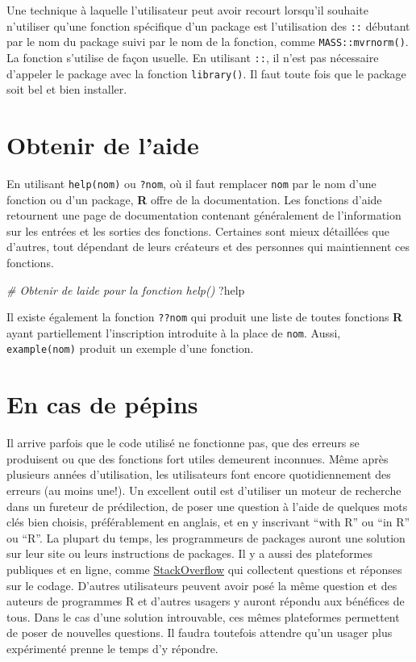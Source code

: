\documentclass[
]{book}
\newenvironment{Shaded}{}{}
\newcommand{\CommentTok}[1]{\textit{#1}}
\newcommand{\NormalTok}[1]{#1}
\begin{document}
Une technique à laquelle l'utilisateur peut avoir recourt lorsqu'il souhaite n'utiliser qu'une fonction spécifique d'un package est l'utilisation des \texttt{::} débutant par le nom du package suivi par le nom de la fonction, comme \texttt{MASS::mvrnorm()}. La fonction s'utilise de façon usuelle. En utilisant \texttt{::}, il n'est pas nécessaire d'appeler le package avec la fonction \texttt{library()}. Il faut toute fois que le package soit bel et bien installer.

\hypertarget{obtenir-de-laide}{%
\section{Obtenir de l'aide}\label{obtenir-de-laide}}

En utilisant \texttt{help(nom)} ou \texttt{?nom}, où il faut remplacer \texttt{nom} par le nom d'une fonction ou d'un package, \textbf{R} offre de la documentation. Les fonctions d'aide retournent une page de documentation contenant généralement de l'information sur les entrées et les sorties des fonctions. Certaines sont mieux détaillées que d'autres, tout dépendant de leurs créateurs et des personnes qui maintiennent ces fonctions.

\begin{Shaded}
\begin{Highlighting}[]
\CommentTok{\# Obtenir de l\textquotesingle{}aide pour la fonction help()}
\NormalTok{?help}
\end{Highlighting}
\end{Shaded}

Il existe également la fonction \texttt{??nom} qui produit une liste de toutes fonctions \textbf{R} ayant partiellement l'inscription introduite à la place de \texttt{nom}. Aussi, \texttt{example(nom)} produit un exemple d'une fonction.

\hypertarget{en-cas-de-puxe9pins}{%
\section{En cas de pépins}\label{en-cas-de-puxe9pins}}

Il arrive parfois que le code utilisé ne fonctionne pas, que des erreurs se produisent ou que des fonctions fort utiles demeurent inconnues. Même après plusieurs années d'utilisation, les utilisateurs font encore quotidiennement des erreurs (au moins une!). Un excellent outil est d'utiliser un moteur de recherche dans un fureteur de prédilection, de poser une question à l'aide de quelques mots clés bien choisis, préférablement en anglais, et en y inscrivant ``with R'' ou ``in R'' ou ``R''. La plupart du temps, les programmeurs de packages auront une solution sur leur site ou leurs instructions de packages. Il y a aussi des plateformes publiques et en ligne, comme \href{https://stackoverflow.com/}{StackOverflow} qui collectent questions et réponses sur le codage. D'autres utilisateurs peuvent avoir posé la même question et des auteurs de programmes R et d'autres usagers y auront répondu aux bénéfices de tous. Dans le cas d'une solution introuvable, ces mêmes plateformes permettent de poser de nouvelles questions. Il faudra toutefois attendre qu'un usager plus expérimenté prenne le temps d'y répondre.
\end{document}
